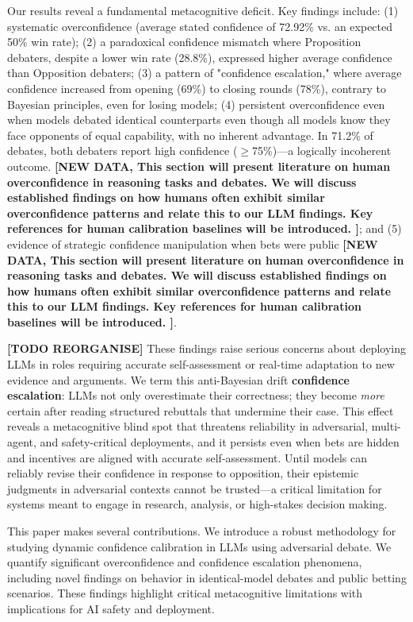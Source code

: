\documentclass{article}
\begin{document}
Our results reveal a fundamental metacognitive deficit. Key findings include: (1) systematic overconfidence (average stated confidence of 72.92\% vs. an expected 50\% win rate); (2) a paradoxical confidence mismatch where Proposition debaters, despite a lower win rate (28.8\%), expressed higher average confidence than Opposition debaters; (3) a pattern of "confidence escalation," where average confidence increased from opening (69\%) to closing rounds (78\%), contrary to Bayesian principles, even for losing models; (4) persistent overconfidence even when models debated identical counterparts even though all models know they face opponents of equal capability, with no inherent advantage. In 71.2\% of debates, both debaters report high confidence ($\ge$75\%)—a logically incoherent outcome. \textbf{[NEW DATA, This section will present literature on human overconfidence in reasoning tasks and debates. We will discuss established findings on how humans often exhibit similar overconfidence patterns and relate this to our LLM findings. Key references for human calibration baselines will be introduced.
]}; and (5) evidence of strategic confidence manipulation when bets were public \textbf{[NEW DATA, This section will present literature on human overconfidence in reasoning tasks and debates. We will discuss established findings on how humans often exhibit similar overconfidence patterns and relate this to our LLM findings. Key references for human calibration baselines will be introduced.
]}.


\textbf{[TODO REORGANISE]} These findings raise serious concerns about deploying LLMs in roles requiring accurate self-assessment or
real-time adaptation to new evidence and arguments. We term this anti-Bayesian drift \textbf{confidence
escalation}: LLMs not only overestimate their correctness; they become \emph{more} certain after reading
structured rebuttals that undermine their case. This effect reveals a metacognitive blind spot that threatens
reliability in adversarial, multi-agent, and safety-critical deployments, and it persists even when bets are
hidden and incentives are aligned with accurate self-assessment. Until models can reliably revise their
confidence in response to opposition, their epistemic judgments in adversarial contexts cannot be trusted—a
critical limitation for systems meant to engage in research, analysis, or high-stakes decision making.

This paper makes several contributions. We introduce a robust methodology for studying dynamic confidence calibration in LLMs using adversarial debate. We quantify significant overconfidence and confidence escalation phenomena, including novel findings on behavior in identical-model debates and public betting scenarios. These findings highlight critical metacognitive limitations with implications for AI safety and deployment.
\end{document}
